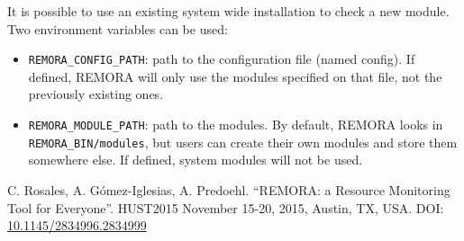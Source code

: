 \documentclass[10pt,a4paper]{report}
\begin{document}
It is possible to use an existing system wide installation to check a new module. 
Two environment variables can be used:
\begin{itemize}
        \item \texttt{REMORA\_CONFIG\_PATH}: path to the configuration file (named config). If defined, REMORA will only use the modules specified on that file, not the previously existing ones.
        \item \texttt{REMORA\_MODULE\_PATH}: path to the modules. By default, REMORA looks in \texttt{REMORA\_BIN/modules}, but users can create their own modules and store them somewhere else. If defined, system modules will not be used.
\end{itemize}

\FloatBarrier
{}
\begin{thebibliography}{00}

 C. Rosales, A. G\'{o}mez-Iglesias, A. Predoehl. ``REMORA: a Resource Monitoring Tool for Everyone''. HUST2015 November 15-20, 2015, Austin, TX, USA. DOI: \href{http://dx.doi.org/10.1145/2834996.2834999}{10.1145/2834996.2834999}


\end{thebibliography}
\end{document}
